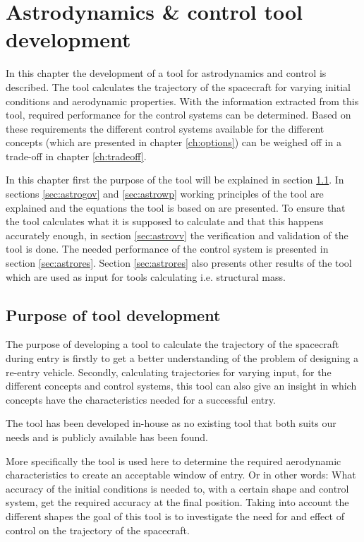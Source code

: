 \section{Astrodynamics \& control tool development}
\label{ch:astrocontrol}
In this chapter the development of a tool for astrodynamics and control is described. The tool calculates the trajectory of the spacecraft for varying initial conditions and aerodynamic properties. With the information extracted from this tool, required performance for the control systems can be determined. Based on these requirements the different control systems available for the different concepts (which are presented in chapter \ref{ch:options}) can be weighed off in a trade-off in chapter \ref{ch:tradeoff}.


In this chapter first the purpose of the tool will be explained in section \ref{sec:astropurpose}. In sections \ref{sec:astrogov} and \ref{sec:astrowp} working principles of the tool are explained and the equations the tool is based on are presented. To ensure that the tool calculates what it is supposed to calculate and that this happens accurately enough, in section \ref{sec:astrovv} the verification and validation of the tool is done. The needed performance of the control system is presented in section \ref{sec:astrores}. Section \ref{sec:astrores} also presents other results of the tool which are used as input for tools calculating i.e. structural mass.


\subsection{Purpose of tool development}
\label{sec:astropurpose}
The purpose of developing a tool to calculate the trajectory of the spacecraft during entry is firstly to get a better understanding of the problem of designing a re-entry vehicle. Secondly, calculating trajectories for varying input, for the different concepts and control systems, this tool can also give an insight in which concepts have the characteristics needed for a successful entry.

The tool has been developed in-house as no existing tool that both suits our needs and is publicly available has been found.

More specifically the tool is used here to determine the required aerodynamic characteristics to create an acceptable window of entry. Or in other words: What accuracy of the initial conditions is needed to, with a certain shape and control system, get the required accuracy at the final position. Taking into account the different shapes the goal of this tool is to investigate the need for and effect of control on the trajectory of the spacecraft.

